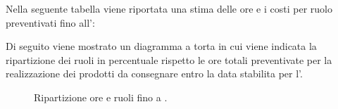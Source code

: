 Nella seguente tabella viene riportata una stima delle ore e i costi per ruolo preventivati fino all':
\begin{table}[H]
    \centering
    \caption{Ripartizione ore e costi fino RTB.}
    \label{tab:stima_costi_RTB} 
\end{table}

Di seguito viene mostrato un diagramma a torta in cui viene indicata la ripartizione dei ruoli in percentuale rispetto le ore totali preventivate per la realizzazione dei prodotti da consegnare entro la data stabilita per l'.

\begin{figure}[H]
    \centering
    \caption{Ripartizione ore e ruoli fino a .}
    \label{fig:pie_ruoli_RTB}
\end{figure}

